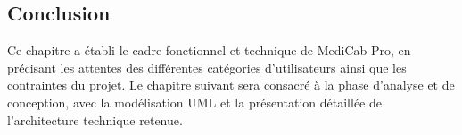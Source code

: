 \subsection{Conclusion}

Ce chapitre a établi le cadre fonctionnel et technique de MediCab Pro, en
précisant les attentes des différentes catégories d'utilisateurs ainsi que les
contraintes du projet. Le chapitre suivant sera consacré à la phase d'analyse
et de conception, avec la modélisation UML et la présentation détaillée de
l'architecture technique retenue.
